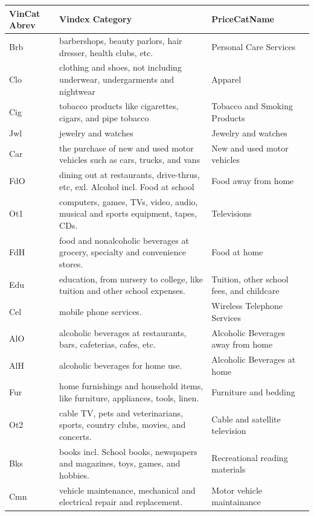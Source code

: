 \documentclass[12pt]{article}
\begin{document}
\begin{table}
\begin{sideways}
\begin{tabular}{|l|l|l|}
\hline
VinCat Abrev & Vindex Category & PriceCatName\\ 
\hline
Brb & barbershops, beauty parlors, hair dresser, health clubs, etc. & Personal Care Services\\ 
\hline
Clo & clothing and shoes, not including underwear, undergarments and nightwear & Apparel\\ 
\hline
Cig & tobacco products like cigarettes, cigars, and pipe tobacco & Tobacco and Smoking Products\\ 
\hline
Jwl & jewelry and watches & Jewelry and watches\\ 
\hline
Car & the purchase of new and used motor vehicles such as cars, trucks, and vans & New and used motor vehicles\\ 
\hline
FdO & dining out at restaurants, drive-thrus, etc, exl. Alcohol incl. Food at school & Food away from home\\ 
\hline
Ot1 & computers, games, TVs, video, audio, musical and sports equipment, tapes, CDs. & Televisions\\ 
\hline
FdH & food and nonalcoholic beverages at grocery, specialty and convenience stores. & Food at home\\ 
\hline
Edu & education, from nursery to college, like tuition and other school expenses. & Tuition, other school fees, and childcare\\ 
\hline
Cel & mobile phone services. & Wireless Telephone Services\\ 
\hline
AlO & alcoholic beverages at restaurants, bars, cafeterias, cafes, etc. & Alcoholic Beverages away from home\\ 
\hline
AlH & alcoholic beverages for home use. & Alcoholic Beverages at home\\ 
\hline
Fur & home furnishings and household items, like furniture, appliances, tools, linen. & Furniture and bedding\\ 
\hline
Ot2 & cable TV, pets and veterinarians, sports, country clubs, movies, and concerts. & Cable and satellite television\\ 
\hline
Bks & books incl. School books, newspapers and magazines, toys, games, and hobbies. & Recreational reading materials\\ 
\hline
Cmn & vehicle maintenance, mechanical and electrical repair and replacement. & Motor vehicle maintainance\\ 

\end{tabular}
\end{sideways}
\end{table}
\end{document}
